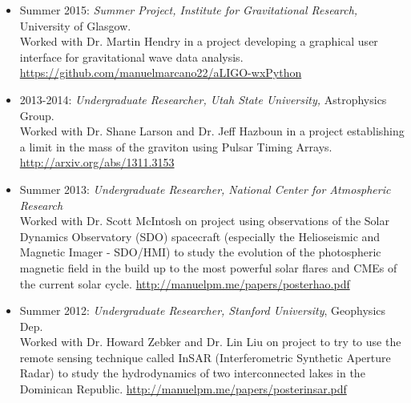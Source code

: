 \documentclass[letterpaper,10pt]{article}
\begin{document}



\begin{itemize}[label=$\blacktriangleright$]
\item Summer 2015: \emph{Summer Project,  Institute for Gravitational Research,} University of Glasgow.\\
 Worked with Dr. Martin Hendry in a project developing a graphical user interface for gravitational wave data analysis. \url{https://github.com/manuelmarcano22/aLIGO-wxPython}
\end{itemize}



\begin{itemize}[label=$\blacktriangleright$]
  \item 2013-2014: \emph{Undergraduate Researcher, Utah State University,} Astrophysics Group.  \\
  Worked with Dr. Shane Larson and Dr. Jeff Hazboun in a project establishing a limit in the mass of the graviton using Pulsar Timing Arrays. \url{http://arxiv.org/abs/1311.3153}
  \end{itemize}

\begin{itemize}[label=$\blacktriangleright$]
  \item Summer 2013: \emph{Undergraduate Researcher, National Center for Atmospheric Research} \\
          Worked with Dr. Scott McIntosh on project using observations of the Solar Dynamics Observatory (SDO) spacecraft (especially the Helioseismic and Magnetic Imager - SDO/HMI) to study the evolution of the photospheric magnetic field in the build up to the most powerful solar flares and CMEs of the current solar cycle. \url{http://manuelpm.me/papers/posterhao.pdf}
  \end{itemize}

\begin{itemize}[label=$\blacktriangleright$]
  \item Summer 2012: \emph{Undergraduate Researcher, Stanford University}, Geophysics Dep.\ \\
          Worked with Dr. Howard Zebker and Dr. Lin Liu on project to try to use the remote sensing technique called InSAR (Interferometric Synthetic Aperture Radar) to study the hydrodynamics of two interconnected lakes in the Dominican Republic. \url{http://manuelpm.me/papers/posterinsar.pdf} 
  \end{itemize}
\end{document}
